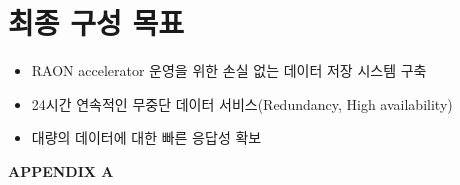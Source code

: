 \documentclass[11pt
  , a4paper
  , article
  , oneside
]{memoir}
\begin{document}
\section{최종 구성 목표}   
\begin{itemize}
	\item RAON accelerator 운영을 위한 손실 없는 데이터 저장 시스템 구축
	\item 24시간 연속적인 무중단 데이터 서비스(Redundancy, High availability)
	\item 대량의 데이터에 대한 빠른 응답성 확보
\end{itemize}

\clearpage




\clearpage

\begin{center}
\label{appx:a}\LARGE\textbf{APPENDIX A}
\end{center}
\end{document}
